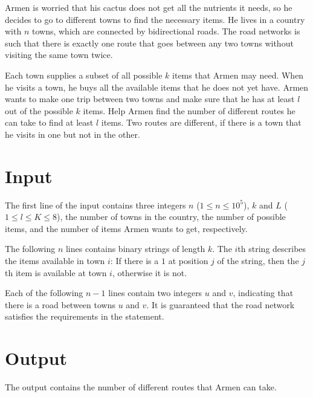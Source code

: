 
Armen is worried that his cactus does not get all the nutrients it needs, so he decides to go to different towns to find the necessary items.
He lives in a country with $n$ towns, which are connected by bidirectional roads.
The road networks is such that there is exactly one route that goes between any two towns without visiting the same town twice.

Each town supplies a subset of all possible $k$ items that Armen may need.
When he visits a town, he buys all the available items that he does not yet have.
Armen wants to make one trip between two towns and make sure that he has at least $l$ out of the possible $k$ items.
Help Armen find the number of different routes he can take to find at least $l$ items.
Two routes are different, if there is a town that he visits in one but not in the other.


\section*{Input}
The first line of the input contains three integers $n$ ($1 \leq n \leq 10^5$), $k$ and $L$ ($1 \leq l \leq K \leq 8$), the number of towns in the country, the number of possible items, and the number of items Armen wants to get, respectively.

The following $n$ lines contains binary strings of length $k$.
The $i$th string describes the items available in town $i$:
If there is a $1$ at position $j$ of the string, then the $j$th item is available at town $i$, otherwise it is not.

Each of the following $n - 1$ lines contain two integers $u$ and $v$, indicating that there is a road between towns $u$ and $v$.
It is guaranteed that the road network satisfies the requirements in the statement.

\section*{Output}
The output contains the number of different routes that Armen can take.

